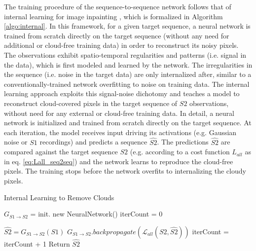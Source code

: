 \documentclass[journal]{IEEEtran}
\begin{document}
The training procedure of the sequence-to-sequence network follows that of internal learning for image inpainting \cite{ulyanov2018deep, zhang2019internal}, which is formalized in Algorithm \ref{algo:internal}. In this framework, for a given target sequence, a neural network is trained from scratch directly on the target sequence (without any need for additional or cloud-free training data) in order to reconstruct its noisy pixels. The observations exhibit spatio-temporal regularities and patterns (i.e. signal in the data), which is first modeled and learned by the network. The irregularities in the sequence (i.e. noise in the target data) are only internalized after, similar to a conventionally-trained network overfitting to noise on training data. The internal learning approach exploits this signal-noise dichotomy and teaches a model to reconstruct cloud-covered pixels in the target sequence of $S2$ observations, without need for any external or cloud-free training data. In detail, a neural network is initialized and trained from scratch directly on the target sequence. At each iteration, the model receives input driving its activations (e.g. Gaussian noise or $S1$ recordings) and predicts a sequence $\hat{S2}$. The predictions $\hat{S2}$ are compared against the target sequence $S2$ (e.g. according to a cost function ${L}_{all}$ as in eq. \ref{eq:Lall_seq2seq}) and the network learns to reproduce the cloud-free pixels. The training stops before the network overfits to internalizing the cloudy pixels. 

\begin{algorithm}
\caption{Internal Learning to Remove Clouds}
		\begin{algorithmic}[1]
			\State $G_{S1 \rightarrow S2}$ = init. new NeuralNetwork()
			\State iterCount = $0$

			\State $\hat{S2} = G_{S1 \rightarrow S2}(S1)$
			\State $G_{S1 \rightarrow S2}.backpropagate(\mathcal{L}_{all}(S2, \hat{S2}))$
            \State iterCount = iterCount + 1
			\EndWhile
			\State Return $\hat{S2}$
			\EndProcedure
		\end{algorithmic}
	  \label{algo:internal}
	\end{algorithm}
	
\end{document}
